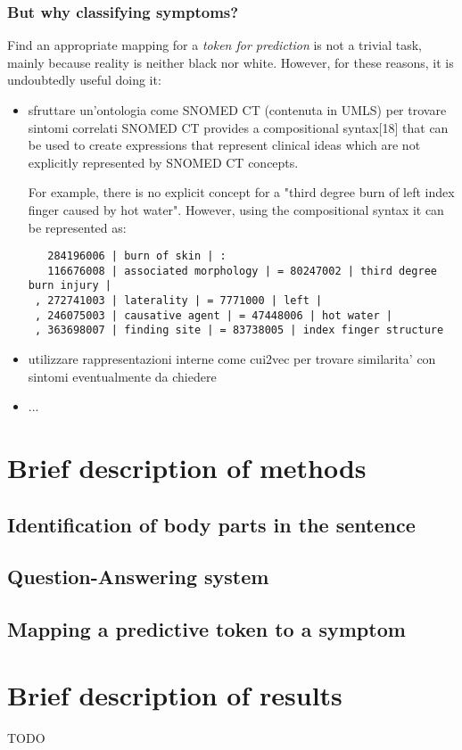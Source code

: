 \subsubsection{But why classifying symptoms?}
Find an appropriate mapping for a \textit{token for prediction} is not a trivial task, mainly because reality is neither black nor white. However, for these reasons, it is undoubtedly useful doing it:
\begin{itemize}
  \item sfruttare un'ontologia come SNOMED CT (contenuta in UMLS) per trovare sintomi correlati
  SNOMED CT provides a compositional syntax[18] that can be used to create expressions that represent clinical ideas which are not explicitly represented by SNOMED CT concepts.

For example, there is no explicit concept for a "third degree burn of left index finger caused by hot water". However, using the compositional syntax it can be represented as:

\begin{verbatim}
   284196006 | burn of skin | :
   116676008 | associated morphology | = 80247002 | third degree burn injury |
 , 272741003 | laterality | = 7771000 | left |
 , 246075003 | causative agent | = 47448006 | hot water |
 , 363698007 | finding site | = 83738005 | index finger structure
\end{verbatim}

  \item utilizzare rappresentazioni interne come cui2vec per trovare similarita' con sintomi eventualmente da chiedere
  \item ...
\end{itemize} 

\section{Brief description of methods}
\label{sec:brief_methods}
\subsection{Identification of body parts in the sentence}
\subsection{Question-Answering system}
\subsection{Mapping a predictive token to a symptom}

\section{Brief description of results}
\label{sec:brief_results}
TODO
